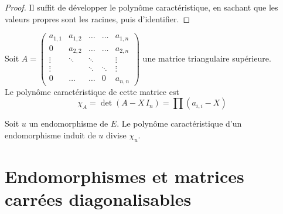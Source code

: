 \documentclass[11pt,a4paper,fleqn,pdftex]{report}
\begin{document}
\begin{proof}
     Il suffit de développer le polynôme caractéristique, en sachant que les valeurs propres sont les racines, puis d'identifier.
\end{proof}
\begin{theorem}
     Soit $A=\begin{pmatrix}
a_{1,1} & a_{1,2} & \ldots & \ldots & a_{1,n} \\
0       & a_{2,2} & \ldots & \ldots & a_{2,n} \\
\vdots  & \ddots  & \ddots &        & \vdots  \\
\vdots  &         & \ddots & \ddots & \vdots  \\
0       & \ldots  & \ldots & 0       & a_{n,n}
\end{pmatrix}$ une matrice triangulaire supérieure.\\[0.6\baselineskip]
Le polynôme caractéristique de cette matrice est 
\begin{equation}
\chi_A = \det (A - X\, I_n) = \prod (a_{i,i} - X)
\end{equation}
\end{theorem}
\begin{theorem}
     Soit $u$ un endomorphisme de $E$. Le polynôme caractéristique d'un endomorphisme induit de $u$ divise $\chi_u$.
\end{theorem}
\section{Endomorphismes et matrices carrées diagonalisables}
\label{sec:diagonalisation}
\end{document}
